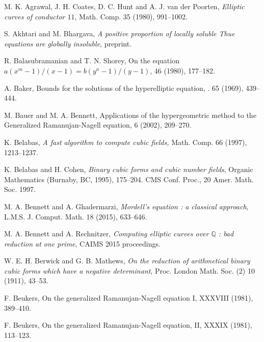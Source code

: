 

\begin{thebibliography}{}

M. K. Agrawal, J. H. Coates, D. C. Hunt and A. J. van der Poorten,
\emph{Elliptic curves of conductor $11$},
Math. Comp. 35 (1980), 991--1002.

S. Akhtari and M. Bhargava,
\emph{A positive proportion of locally soluble Thue equations are globally insoluble}, preprint.

R. Balasubramanian and T. N. Shorey,
\newblock On the equation $a(x^m-1)/(x-1) = b (y^n-1)/(y-1)$,
  46 (1980), 177--182.

A. Baker,
\newblock Bounds for the solutions of the hyperelliptic equation, 
. 65 (1969), 439--444. 

M. Bauer and M. A. Bennett,
\newblock Applications of the hypergeometric method to the Generalized Ramanujan-Nagell equation,
 6 (2002), 209--270.

K. Belabas,
\emph{A fast algorithm to compute cubic fields,} Math. Comp. 66 (1997), 1213--1237.

K. Belabas and H. Cohen,
\emph{Binary cubic forms and cubic number fields},
Organic Mathematics (Burnaby, BC, 1995), 175--204. CMS Conf. Proc., 20 Amer. Math. Soc. 1997.

M. A. Bennett and A. Ghadermarzi,
\emph{Mordell's equation : a classical approach},
L.M.S. J. Comput. Math. 18 (2015), 633--646.

M. A. Bennett and A. Rechnitzer,
\emph{Computing elliptic curves over $\mathbb{Q}$ : bad reduction at one prime}, 
CAIMS 2015 proceedings.

W. E. H. Berwick and G. B. Mathews,
\emph{On the reduction of arithmetical binary cubic forms which have a negative determinant},
Proc. London Math. Soc. (2) 10 (1911), 43--53.

F. Beukers,
\newblock On the generalized Ramanujan-Nagell equation I,
 XXXVIII (1981), 389--410.

F. Beukers,
\newblock On the generalized Ramanujan-Nagell equation, II,
 XXXIX (1981), 113--123.


\end{thebibliography}
